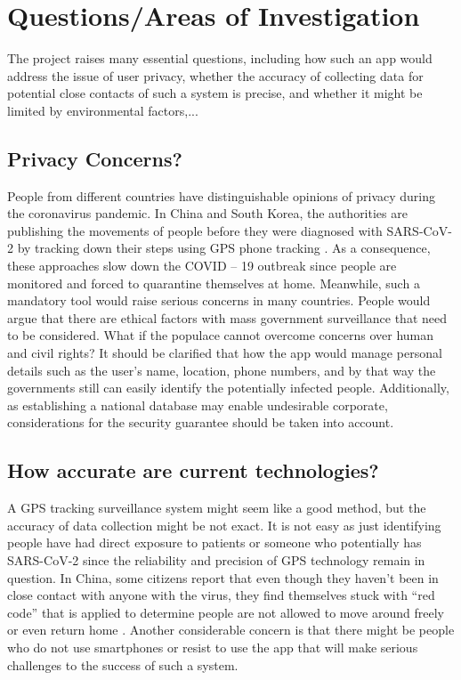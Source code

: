 \section{Questions/Areas of Investigation}
  \par The project raises many essential questions, including how such an app would address the issue of user privacy, whether the accuracy of collecting data for potential close contacts of such a system is precise, and whether it might be limited by environmental factors,...
  \subsection{Privacy Concerns?}
    \par People from different countries have distinguishable opinions of privacy during the coronavirus pandemic. In China and South Korea, the authorities are publishing the movements of people before they were diagnosed with SARS-CoV-2 by tracking down their steps using GPS phone tracking \parencite{SingTraceTogether}. As a consequence, these approaches slow down the COVID – 19 outbreak since people are monitored and forced to quarantine themselves at home. Meanwhile, such a mandatory tool would raise serious concerns in many countries. People would argue that there are ethical factors with mass government surveillance that need to be considered. What if the populace cannot overcome concerns over human and civil rights? It should be clarified that how the app would manage personal details such as the user’s name, location, phone numbers, and by that way the governments still can easily identify the potentially infected people. Additionally, as establishing a national database may enable undesirable corporate, considerations for the security guarantee should be taken into account.
  \subsection{How accurate are current technologies?}
    \par A GPS tracking surveillance system might seem like a good method, but the accuracy of data collection might be not exact. It is not easy as just identifying people have had direct exposure to patients or someone who potentially has SARS-CoV-2 since the reliability and precision of GPS technology remain in question. In China, some citizens report that even though they haven’t been in close contact with anyone with the virus, they find themselves stuck with “red code” that is applied to determine people are not allowed to move around freely or even return home \parencite{Questions2}. Another considerable concern is that there might be people who do not use smartphones or resist to use the app that will make serious challenges to the success of such a system.
